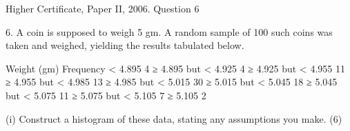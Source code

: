 \documentclass[a4paper,12pt]{article}
\begin{document}
Higher Certificate, Paper II, 2006.  Question 6 

\begin{framed}


6. A coin is supposed to weigh 5 gm.  A random sample of 100 such coins was taken and weighed, yielding the results tabulated below. 
 
 
Weight (gm) Frequency < 4.895   4 ≥ 4.895 but < 4.925   4 ≥ 4.925 but < 4.955 11 ≥ 4.955 but < 4.985 13 ≥ 4.985 but < 5.015 30 ≥ 5.015 but < 5.045 18 ≥ 5.045 but < 5.075 11 ≥ 5.075 but < 5.105   7 ≥ 5.105   2 
 
 
(i) Construct a histogram of these data, stating any assumptions you make. 
(6) 

 

\end{framed}
\end{document}
